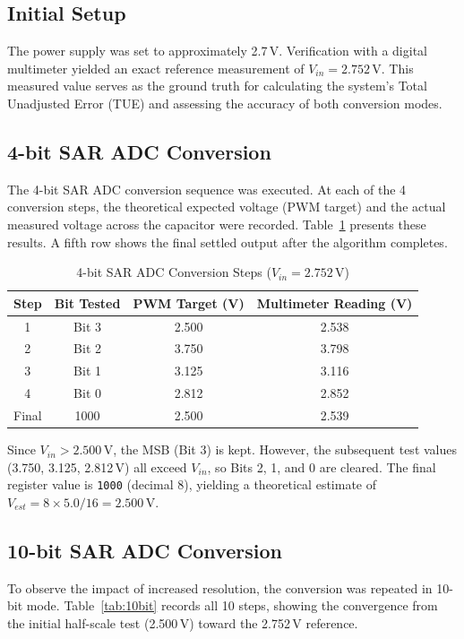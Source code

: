 \documentclass[12pt]{article}
\begin{document}
\subsection{Initial Setup}
The power supply was set to approximately 2.7\,V. Verification with a digital multimeter yielded an exact reference measurement of $V_{in} = 2.752$\,V. This measured value serves as the ground truth for calculating the system's Total Unadjusted Error (TUE) and assessing the accuracy of both conversion modes.

\subsection{4-bit SAR ADC Conversion}
The 4-bit SAR ADC conversion sequence was executed. At each of the 4 conversion steps, the theoretical expected voltage (PWM target) and the actual measured voltage across the capacitor were recorded. Table~\ref{tab:4bit} presents these results. A fifth row shows the final settled output after the algorithm completes.

\begin{table}[H]
    \centering
    \caption{4-bit SAR ADC Conversion Steps ($V_{in} = 2.752$\,V)}
    \label{tab:4bit}
    \begin{tabular}{cccc}
        \toprule
        Step & Bit Tested & PWM Target (V) & Multimeter Reading (V) \\
        \midrule
        1 & Bit 3 & 2.500 & 2.538 \\
        2 & Bit 2 & 3.750 & 3.798 \\
        3 & Bit 1 & 3.125 & 3.116 \\
        4 & Bit 0 & 2.812 & 2.852 \\
        \midrule
        Final & 1000 & 2.500 & 2.539 \\
        \bottomrule
    \end{tabular}
\end{table}

Since $V_{in} > 2.500$\,V, the MSB (Bit 3) is kept. However, the subsequent test values (3.750, 3.125, 2.812\,V) all exceed $V_{in}$, so Bits 2, 1, and 0 are cleared. The final register value is \texttt{1000} (decimal 8), yielding a theoretical estimate of $V_{est} = 8 \times 5.0 / 16 = 2.500$\,V.

\subsection{10-bit SAR ADC Conversion}
To observe the impact of increased resolution, the conversion was repeated in 10-bit mode. Table~\ref{tab:10bit} records all 10 steps, showing the convergence from the initial half-scale test (2.500\,V) toward the 2.752\,V reference.
\end{document}
